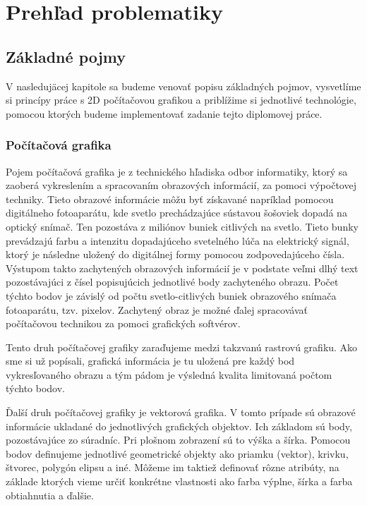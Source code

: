 \chapter{Prehľad problematiky}\label{chap:issues_overview}

\section{Základné pojmy}

V nasledujäcej kapitole sa budeme venovať popisu základných pojmov, vysvetlíme si princípy práce s 2D počítačovou grafikou a priblížime si jednotlivé technológie, pomocou ktorých budeme implementovať zadanie tejto diplomovej práce.

\subsection{Počítačová grafika}

Pojem počítačová grafika je z technického hľadiska odbor informatiky, ktorý sa zaoberá vykreslením a spracovaním obrazových informácií, za pomoci výpočtovej techniky. Tieto obrazové informácie môžu byť získavané napríklad pomocou digitálneho fotoaparátu, kde svetlo prechádzajúce sústavou šošoviek dopadá na optický snímač. Ten pozostáva z miliónov buniek citlivých na svetlo. Tieto bunky prevádzajú farbu a intenzitu dopadajúceho svetelného lúča na elektrický signál, ktorý je následne uložený do digitálnej formy pomocou zodpovedajúceho čísla. Výstupom takto zachytených obrazových informácií je v podstate veľmi dlhý text pozostávajúci z čísel popisujúcich jednotlivé body zachyteného obrazu. Počet týchto bodov je závislý od počtu svetlo-citlivých buniek obrazového snímača fotoaparátu, tzv. pixelov. Zachytený obraz je možné ďalej spracovávať počítačovou technikou za pomoci grafických softvérov. 

Tento druh počítačovej grafiky zaraďujeme medzi takzvanú rastrovú grafiku. Ako sme si už popísali, grafická informácia je tu uložená pre každý bod vykresľovaného obrazu a tým pádom je výsledná kvalita limitovaná počtom týchto bodov. 

Ďalší druh počítačovej grafiky je vektorová grafika. V tomto prípade sú obrazové informácie ukladané do jednotlivých grafických objektov. Ich základom sú body, pozostávajúce zo súradníc. Pri plošnom zobrazení sú to výška a šírka. Pomocou bodov definujeme jednotlivé geometrické objekty ako priamku (vektor), krivku, štvorec, polygón elipsu a iné. Môžeme im taktiež definovať rôzne atribúty, na základe ktorých vieme určiť konkrétne vlastnosti ako farba výplne, šírka a farba obtiahnutia a ďalšie.

